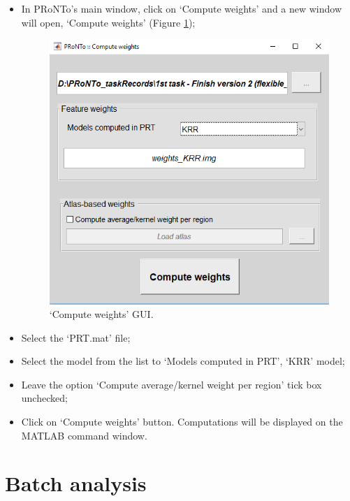 \begin{itemize}
\item In PRoNTo's main window, click on `Compute weights' and a new window will open, `Compute weights' (Figure \ref{fig:weights_reg});

\begin{figure}[h!]
	\centering
		\includegraphics[scale=0.7]{images/Tutorial/confounds/weights_reg.png}
	\caption{`Compute weights' GUI.}
	\label{fig:weights_reg}
\end{figure}

\item Select the `PRT.mat' file;

\item Select the model from the list to `Models computed in PRT', `KRR' model;

\item Leave the option `Compute average/kernel weight per region' tick box unchecked;

\item Click on `Compute weights' button. Computations will be displayed on the MATLAB command window.

\end{itemize}
	


\section{Batch analysis}
\label{sec:Batch_analysis_svm_confounds}

